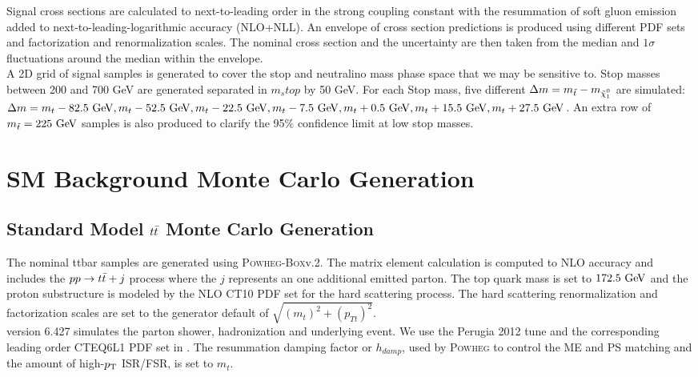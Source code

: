 \indent Signal cross sections are calculated to next-to-leading order in the strong coupling constant with the resummation of soft gluon emission added to next-to-leading-logarithmic accuracy (NLO+NLL).\cite{stopXsec}  An envelope of cross section predictions is produced using different PDF sets and factorization and renormalization scales.  The nominal cross section and the uncertainty are then taken from the median and $1\sigma$ fluctuations around the median within the envelope.  \\

\indent A 2D grid of signal samples is generated to cover the stop and neutralino mass phase space that we may be sensitive to.  Stop masses between 200 and 700 GeV are generated separated in $m_stop$ by 50 GeV.  For each Stop mass, five different ${\Delta}m = m_{\stop} - m_{\ninoone}$ are simulated: ${\Delta}m = m_{t} - 82.5 \gev, m_{t} - 52.5 \gev, m_{t} - 22.5 \gev, m_{t} - 7.5 \gev, m_{t}+0.5 \gev,  m_{t}+15.5 \gev, m_{t}+27.5 \gev$.  An extra row of $m_{\stop} = 225 \gev$ samples is also produced to clarify the 95\% confidence limit at low stop masses. \\

\section{SM Background Monte Carlo Generation}
\label{sec:MC:Bkg}

\subsection{Standard Model $t\bar{t}$ Monte Carlo Generation}

\indent The nominal ttbar samples are generated using \textsc{Powheg-Box}v.2.\cite{PowhegTTbar}  The matrix element calculation is computed to NLO accuracy and includes the $pp \rightarrow t\bar{t} + j$ process where the $j$ represents an one additional emitted parton.  The top quark mass is set to $172.5 \gev$ and the proton substructure is modeled by the NLO CT10 PDF set \cite{CT10} for the hard scattering process.  The hard scattering renormalization and factorization scales are set to the generator default of $\sqrt{(m_{t})^2 + (p_{T t})^2}$.  \\

\indent {} version 6.427 simulates the parton shower, hadronization and underlying event.\cite{Pythia6}  We use the Perugia 2012 tune \cite{Perugia2012} and the corresponding leading order CTEQ6L1 PDF set \cite{CTEQ6L1} in .  The resummation damping factor or $h_{damp}$, used by \textsc{Powheg} to control the ME and PS matching and the amount of high-$p_{\mathrm{T}}$ ISR/FSR, is set to $m_{t}$. \\

